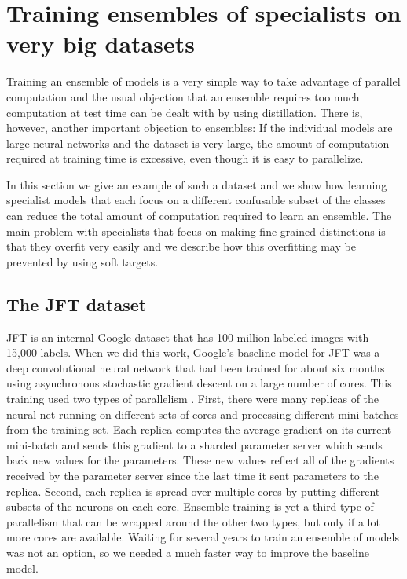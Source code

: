 \section{Training ensembles of specialists on very big datasets}

Training an ensemble of models is a very simple way to take advantage
of parallel computation and the usual objection that an ensemble
requires too much computation at test time can be dealt with by using
distillation. There is, however, another important objection to
ensembles: If the individual models are large neural networks and the
dataset is very large, the amount of computation required at training
time is excessive, even though it is easy to parallelize.

In this section we give an example of such a dataset and we show how
learning specialist models that each focus on a different confusable
subset of the classes can reduce the total amount of computation
required to learn an ensemble.  The main problem with specialists that
focus on making fine-grained distinctions is that they overfit very
easily and we describe how this overfitting may be prevented by using
soft targets.

\subsection{The JFT dataset}

JFT is an internal Google dataset that has 100 million labeled images
with 15,000 labels. When we did this work, Google's baseline model for
JFT was a deep convolutional neural network \cite{Kriz} that had been trained for
about six months using asynchronous stochastic gradient descent on a
large number of cores.  This training used two types of
parallelism \cite{brain-stuff}. First, there were many replicas of the neural net running
on different sets of cores and processing different mini-batches from
the training set. Each replica computes the average gradient on its
current mini-batch and sends this gradient to a sharded parameter server which
sends back new values for the parameters. These new values reflect all
of the gradients received by the parameter server since the last time
it sent parameters to the replica. Second, each replica is spread over
multiple cores by putting different subsets of the neurons on each
core. Ensemble training is yet a third type of parallelism that can be
wrapped around the other two types, but only if a lot more cores are
available. Waiting for several years to train an ensemble of models was
not an option, so we needed a much faster way to improve the baseline
model. 

